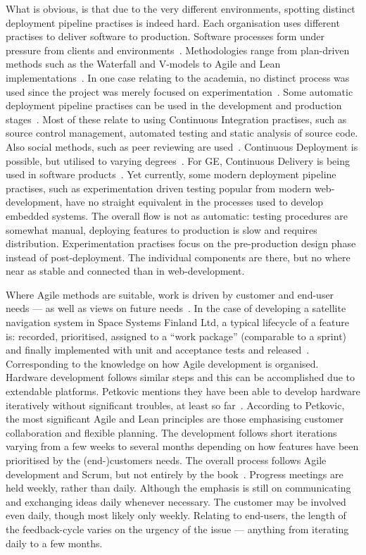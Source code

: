 \documentclass[english]{tktltiki2}
\begin{document}
What is obvious, is that due to the very different environments, spotting distinct deployment pipeline practises is indeed hard. Each organisation uses different practises to deliver software to production. Software processes form under pressure from clients and environments~\cite{Hol15a, Hol15b, Koi15}. Methodologies range from plan-driven methods such as the Waterfall and V-models to Agile and Lean implementations~\cite{BT15, Hol15a, Hol15b, Koi15, Pet15}. In one case relating to the academia, no distinct process was used since the project was merely focused on experimentation~\cite{Kri15}. Some automatic deployment pipeline practises can be used in the development and production stages~\cite{BT15, Hol15a, Hol15b, Koi15, Pet15}. Most of these relate to using Continuous Integration practises, such as source control management, automated testing and static analysis of source code. Also social methods, such as peer reviewing are used~\cite{Hol15b}. Continuous Deployment is possible, but utilised to varying degrees~\cite{BT15, Hol15a, Hol15b, Koi15, Pet15}. For GE, Continuous Delivery is being used in software products~\cite{BT15}. Yet currently, some modern deployment pipeline practises, such as experimentation driven testing popular from modern web-development, have no straight equivalent in the processes used to develop embedded systems. The overall flow is not as automatic: testing procedures are somewhat manual, deploying features to production is slow and requires distribution. Experimentation practises focus on the pre-production design phase instead of post-deployment. The individual components are there, but no where near as stable and connected than in web-development.

Where Agile methods are suitable, work is driven by customer and end-user needs — as well as views on future needs~\cite{BT15, Pet15}. In the case of developing a satellite navigation system in Space Systems Finland Ltd, a typical lifecycle of a feature is: recorded, prioritised, assigned to a “work package” (comparable to a sprint) and finally implemented with unit and acceptance tests and released~\cite{Pet15}. Corresponding to the knowledge on how Agile development is organised. Hardware development follows similar steps and this can be accomplished due to extendable platforms. Petkovic mentions they have been able to develop hardware iteratively without significant troubles, at least so far~\cite{Pet15}. According to Petkovic, the most significant Agile and Lean principles are those emphasising customer collaboration and flexible planning. The development follows short iterations varying from a few weeks to several months depending on how features have been prioritised by the (end-)customers needs. The overall process follows Agile development and Scrum, but not entirely by the book~\cite{Pet15}. Progress meetings are held weekly, rather than daily. Although the emphasis is still on communicating and exchanging ideas daily whenever necessary. The customer may be involved even daily, though most likely only weekly. Relating to end-users, the length of the feedback-cycle varies on the urgency of the issue — anything from iterating daily to a few months.
\end{document}
